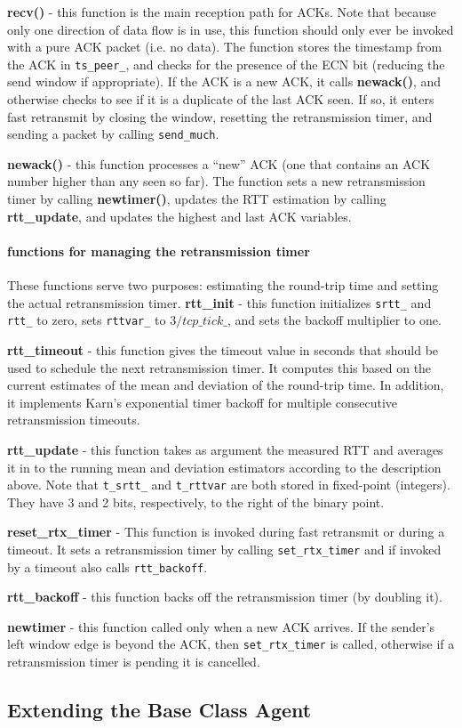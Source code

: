 \documentclass{article}
\begin{document}
{\bf recv()} - this function is the main reception path for ACKs.
Note that because only one direction of data flow is in use, this function
should only ever be invoked with a pure ACK packet (i.e. no data).
The function stores the timestamp from the ACK in {\tt ts\_peer\_}, and
checks for the presence of the ECN bit (reducing the send window if
appropriate).
If the ACK is a new ACK, it calls {\bf newack()}, and otherwise
checks to see if it is a duplicate of the last ACK seen.
If so, it enters fast retransmit by closing the window, resetting the
retransmission timer, and sending a packet by calling {\tt send\_much}.

{\bf newack()} - this function processes a ``new'' ACK (one that contains
an ACK number higher than any seen so far).
The function sets a new retransmission timer by calling {\bf newtimer()},
updates the RTT estimation by calling {\bf rtt\_update}, and updates
the highest and last ACK variables.

\paragraph{functions for managing the retransmission timer}

These functions serve two purposes: estimating the round-trip time
and setting the actual retransmission timer.
{\bf rtt\_init} - this function initializes {\tt srtt\_} and {\tt rtt\_}
to zero, sets {\tt rttvar\_} to $3/tcp\_tick\_$, and sets the backoff
multiplier to one.

{\bf rtt\_timeout} - this function gives the timeout value in seconds that
should be used to schedule the next retransmission timer.
It computes this based on the current estimates of the mean and deviation
of the round-trip time.  In addition, it implements Karn's
exponential timer backoff for multiple consecutive retransmission timeouts.

{\bf rtt\_update} - this function takes as argument the measured RTT
and averages it in to the running mean and deviation estimators
according to the description above.
Note that {\tt t\_srtt\_} and {\tt t\_rttvar} are both
stored in fixed-point (integers).
They have 3 and 2 bits, respectively, to the right of the binary
point.

{\bf reset\_rtx\_timer} -  This function is invoked during fast retransmit
or during a timeout.
It sets a retransmission timer
by calling {\tt set\_rtx\_timer} and if invoked by a timeout also calls
{\tt rtt\_backoff}.

{\bf rtt\_backoff} - this function backs off the retransmission timer
(by doubling it).

{\bf newtimer} - this function called only when a new ACK arrives.
If the sender's left window edge is beyond the ACK, then
{\tt set\_rtx\_timer} is called, otherwise if a retransmission timer
is pending it is cancelled.

\subsection{Extending the Base Class Agent}
\label{sec:extensions}
\end{document}
